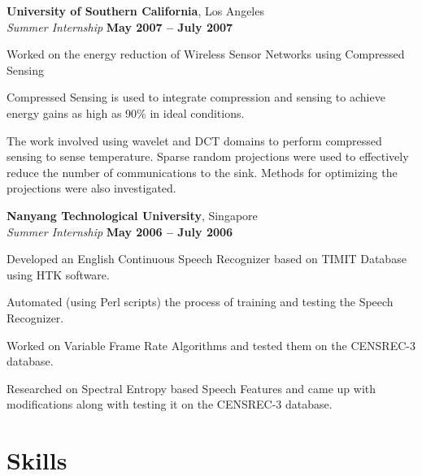 \documentclass[margin,line]{resume}
\begin{document}
\begin{resume}
    \textbf{University of Southern California}, Los Angeles\\%
    \textsl{Summer Internship} \hfill \textbf{May 2007 -- July 2007}
    \begin{list2}
    \item Worked on the energy reduction of Wireless Sensor Networks using Compressed Sensing
    \item Compressed Sensing is used to integrate compression and sensing to achieve energy gains as high as 90\% in ideal conditions.
    \item The work involved using wavelet and DCT domains to perform compressed sensing to sense temperature. Sparse random projections were used to effectively reduce the number of communications to the sink. Methods for optimizing the projections were also investigated.     
    \end{list2}
    
    \textbf{Nanyang Technological University}, Singapore \\%
    \textsl{Summer Internship} \hfill \textbf{May 2006 -- July 2006}
    \begin{list2}
    \item Developed an English Continuous Speech Recognizer based on TIMIT Database using HTK software.
    \item Automated (using Perl scripts) the process of training and testing the Speech Recognizer.
    \item Worked on Variable Frame Rate Algorithms and tested them on the CENSREC-3 database.
    \item Researched on Spectral Entropy based Speech Features and came up with modifications along with testing it on the CENSREC-3 database.
    \end{list2}
    


    
    \section{\mysidestyle Skills} 


\end{resume}
\end{document}
